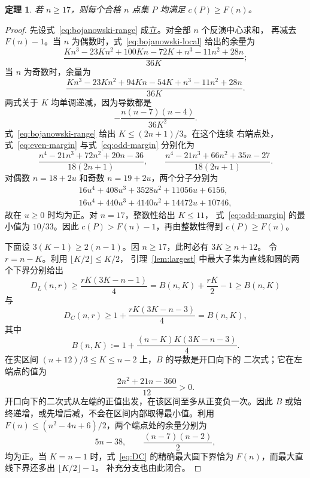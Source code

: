 \documentclass[11pt,a4paper]{ctexart}
\newtheorem{theorem}{定理}[section]
\theoremstyle{definition}
\begin{document}
\begin{theorem}\label{thm:nge17}
若 \(n\ge17\)，则每个合格 \(n\) 点集 \(P\) 均满足 \(c(P)\ge F(n)\)。
\end{theorem}

\begin{proof}
先设式~\eqref{eq:bojanowski-range} 成立。对全部 \(n\) 个反演中心求和，
再减去 \(F(n)-1\)。当 \(n\) 为偶数时，式~\eqref{eq:bojanowski-local}
给出的余量为
\begin{equation}\label{eq:even-margin}
 \frac{Kn^3-23Kn^2+100Kn-72K+n^3-11n^2+28n}{36K};
\end{equation}
当 \(n\) 为奇数时，余量为
\begin{equation}\label{eq:odd-margin}
 \frac{Kn^3-23Kn^2+94Kn-54K+n^3-11n^2+28n}{36K}.
\end{equation}
两式关于 \(K\) 均单调递减，因为导数都是
\[
 -\frac{n(n-7)(n-4)}{36K^2}.
\]
式~\eqref{eq:bojanowski-range} 给出 \(K\le(2n+1)/3\)。在这个连续
右端点处，式~\eqref{eq:even-margin} 与式~\eqref{eq:odd-margin}
分别化为
\[
 \frac{n^4-21n^3+72n^2+20n-36}{18(2n+1)},\qquad
 \frac{n^4-21n^3+66n^2+35n-27}{18(2n+1)}.
\]
对偶数 \(n=18+2u\) 和奇数 \(n=19+2u\)，两个分子分别为
\[
\begin{split}
16u^4+408u^3+3528u^2+11056u+6156,\\
16u^4+440u^3+4140u^2+14472u+10746,
\end{split}
\]
故在 \(u\ge0\) 时均为正。对 \(n=17\)，整数性给出 \(K\le11\)，
式~\eqref{eq:odd-margin} 的最小值为 \(10/33\)。因此
\(c(P)>F(n)-1\)，再由整数性得到 \(c(P)\ge F(n)\)。

下面设 \(3(K-1)\ge2(n-1)\)。因 \(n\ge17\)，此时必有 \(3K\ge n+12\)。
令 \(r=n-K\)。利用 \(\lfloor K/2\rfloor\le K/2\)，
引理~\ref{lem:largest} 中最大子集为直线和圆的两个下界分别给出
\[
 D_L(n,r)\ge \frac{rK(3K-n-1)}4
     =B(n,K)+\frac{rK}{2}-1\ge B(n,K)
\]
与
\[
 D_C(n,r)\ge1+\frac{rK(3K-n-3)}4=B(n,K),
\]
其中
\begin{equation}\label{eq:coarse}
 B(n,K):=1+\frac{(n-K)K(3K-n-3)}4.
\end{equation}
在实区间 \((n+12)/3\le K\le n-2\) 上，\(B\) 的导数是开口向下的
二次式；它在左端点的值为
\[
 \frac{2n^2+21n-360}{12}>0.
\]
开口向下的二次式从左端的正值出发，在该区间至多从正变负一次。因此
\(B\) 或始终递增，或先增后减，不会在区间内部取得最小值。利用
\(F(n)\le(n^2-4n+6)/2\)，两个端点处的余量分别为
\[
 5n-38,\qquad \frac{(n-7)(n-2)}2,
\]
均为正。当 \(K=n-1\) 时，式~\eqref{eq:DC} 的精确最大圆下界恰为
\(F(n)\)，而最大直线下界还多出 \(\lfloor K/2\rfloor-1\)。
补充分支也由此闭合。
\end{proof}
\end{document}
